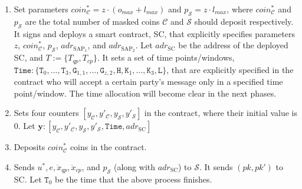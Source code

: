 \begin{enumerate}
\begin{enumerate}
\item Set parameters  $coin^{\scriptscriptstyle *}_{\scriptscriptstyle\mathcal C}=z\cdot (o_{\scriptscriptstyle max}+l_{\scriptscriptstyle max})$ and $p_{\scriptscriptstyle\mathcal{S}}=z\cdot l_{\scriptscriptstyle max}$, where $coin^{\scriptscriptstyle *}_{\scriptscriptstyle\mathcal C}$ and $p_{\scriptscriptstyle\mathcal{S}}$ are   the total number of masked coins $\mathcal C$ and $\mathcal S$ should deposit respectively. It signs and deploys a smart contract, SC, that explicitly specifies  parameters $z$,  $coin^{\scriptscriptstyle *}_{\scriptscriptstyle\mathcal C}$, $p_{\scriptscriptstyle\mathcal{S}}$,  $adr_{\scriptscriptstyle\text{SAP}_{\scriptscriptstyle 1}}$, and $adr_{\scriptscriptstyle\text{SAP}_{\scriptscriptstyle 2}}$. Let $adr_{\scriptscriptstyle \text{SC}}$ be the address of the deployed SC, and $T:=\{T_{\scriptscriptstyle qp},T_{\scriptscriptstyle cp}\}$. It sets a set of time points/windows, $\texttt{Time}:\{ \texttt{T}_{\scriptscriptstyle 0},..., \texttt{T}_{\scriptscriptstyle 3},\texttt{G}_{\scriptscriptstyle 1,1},...,\texttt{G}_{\scriptscriptstyle z,2},\texttt{H}, \texttt{K}_{\scriptscriptstyle 1},...,\texttt{K}_{\scriptscriptstyle 3}, \texttt{L}\}$, that are explicitly specified in the contract who will accept a certain party's message only in a specified  time point/window. The time allocation will become clear in the next phases. 


\item Sets four counters $[y_{\scriptscriptstyle\mathcal C},y'_{\scriptscriptstyle\mathcal C},y_{\scriptscriptstyle\mathcal S}, y'_{\scriptscriptstyle\mathcal S}]$ in the contract, where their initial value is $0$. Let $\bm{y}: [y_{\scriptscriptstyle\mathcal C},y'_{\scriptscriptstyle\mathcal C},y_{\scriptscriptstyle\mathcal S}, y'_{\scriptscriptstyle\mathcal S}, \texttt{Time},adr_{\scriptscriptstyle \text{SC}}]$

\item Deposits $coin^{\scriptscriptstyle *}_{\scriptscriptstyle\mathcal C}$ coins in the contract.

\item Sends $u^{\scriptscriptstyle *}, e, \ddot{x}_{\scriptscriptstyle qp},\ddot{x}_{\scriptscriptstyle cp}$, and $p_{\scriptscriptstyle\mathcal{S}}$ (along with $adr_{\scriptscriptstyle \text{SC}}$) to $\mathcal S$. It sends  $(pk,pk')$ to SC. Let $\texttt{T}_{\scriptscriptstyle 0}$ be the time that the above process finishes. 



\end{enumerate}


\end{enumerate}

